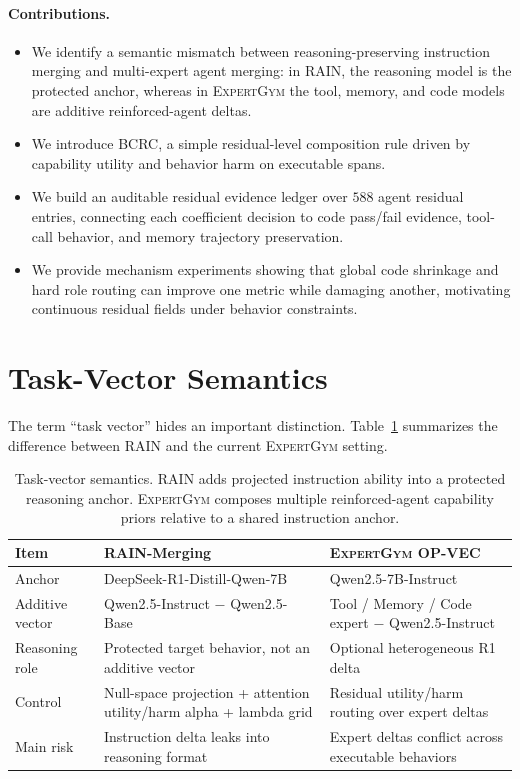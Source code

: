 \documentclass{article}
\newcommand{\method}{\textsc{ExpertGym}\xspace}
\newcommand{\bcrc}{\textsc{BCRC}\xspace}
\newcommand{\rain}{\textsc{RAIN}\xspace}
\begin{document}
\paragraph{Contributions.}
\begin{itemize}[leftmargin=*]
    \item We identify a semantic mismatch between reasoning-preserving instruction merging and multi-expert agent merging: in \rain, the reasoning model is the protected anchor, whereas in \method the tool, memory, and code models are additive reinforced-agent deltas.
    \item We introduce \bcrc, a simple residual-level composition rule driven by capability utility and behavior harm on executable spans.
    \item We build an auditable residual evidence ledger over $588$ agent residual entries, connecting each coefficient decision to code pass/fail evidence, tool-call behavior, and memory trajectory preservation.
    \item We provide mechanism experiments showing that global code shrinkage and hard role routing can improve one metric while damaging another, motivating continuous residual fields under behavior constraints.
\end{itemize}

\section{Task-Vector Semantics}

The term ``task vector'' hides an important distinction.  Table~\ref{tab:semantic} summarizes the difference between \rain and the current \method setting.

\begin{table}[t]
\centering
\small
\begin{tabularx}{\linewidth}{lXX}
\toprule
Item & \rain-Merging & \method OP-VEC \\
\midrule
Anchor & DeepSeek-R1-Distill-Qwen-7B & Qwen2.5-7B-Instruct \\
Additive vector & Qwen2.5-Instruct $-$ Qwen2.5-Base & Tool / Memory / Code expert $-$ Qwen2.5-Instruct \\
Reasoning role & Protected target behavior, not an additive vector & Optional heterogeneous R1 delta \\
Control & Null-space projection + attention utility/harm alpha + lambda grid & Residual utility/harm routing over expert deltas \\
Main risk & Instruction delta leaks into reasoning format & Expert deltas conflict across executable behaviors \\
\bottomrule
\end{tabularx}
\caption{Task-vector semantics.  \rain adds projected instruction ability into a protected reasoning anchor.  \method composes multiple reinforced-agent capability priors relative to a shared instruction anchor.}
\label{tab:semantic}
\end{table}
\end{document}

